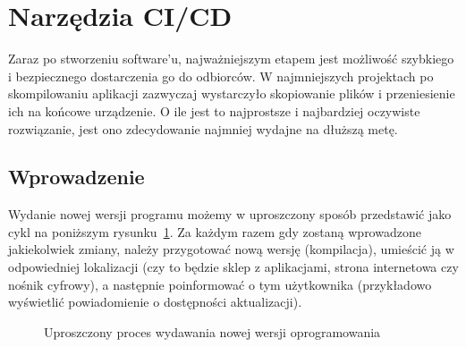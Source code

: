 \section{Narzędzia CI/CD}


Zaraz po stworzeniu software'u, najważniejszym etapem jest możliwość szybkiego i bezpiecznego dostarczenia go do odbiorców.
W najmniejszych projektach po skompilowaniu aplikacji zazwyczaj wystarczyło skopiowanie plików
i przeniesienie ich na końcowe urządzenie. O ile jest to najprostsze i najbardziej oczywiste rozwiązanie,
jest ono zdecydowanie najmniej wydajne na dłuższą metę.

\subsection{Wprowadzenie}
Wydanie nowej wersji programu możemy w uproszczony sposób przedstawić jako cykl na poniższym rysunku~\ref{fig:cyklZmian}.
Za każdym razem gdy zostaną wprowadzone jakiekolwiek zmiany, należy przygotować nową wersję (kompilacja),
umieścić ją w odpowiedniej lokalizacji (czy to będzie sklep z aplikacjami, strona internetowa czy nośnik cyfrowy),
a następnie poinformować o tym użytkownika (przykładowo wyświetlić powiadomienie o dostępności aktualizacji).


\begin{figure}[!htp]
    \centering
    \caption{Uproszczony proces wydawania nowej wersji oprogramowania}
    \label{fig:cyklZmian}
\end{figure}

